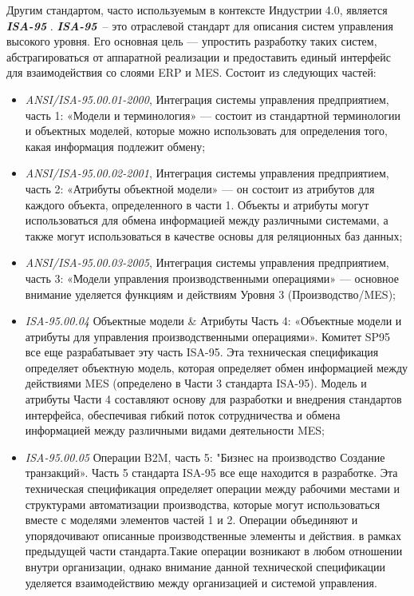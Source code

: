 Другим стандартом, часто используемым в контексте Индустрии 4.0, является \textit{\textbf{ISA-95}} \cite{ISA95}. \textit{\textbf{ISA-95}} – это отраслевой стандарт для описания систем управления высокого уровня. Его основная цель — упростить разработку таких систем, абстрагироваться от аппаратной реализации и предоставить единый интерфейс для взаимодействия со слоями ERP и MES. Состоит из следующих частей:
\begin{itemize}
\item \textit {ANSI/ISA-95.00.01-2000}, Интеграция системы управления предприятием, часть 1:
«Модели и терминология» — состоит из стандартной терминологии и объектных моделей, которые можно использовать для определения того, какая информация подлежит обмену;
\item \textit {ANSI/ISA-95.00.02-2001}, Интеграция системы управления предприятием, часть 2:
«Атрибуты объектной модели» — он состоит из атрибутов для каждого объекта, определенного в части 1. Объекты и атрибуты могут использоваться для обмена информацией между различными системами, а также могут использоваться в качестве основы для реляционных баз данных;
\item \textit {ANSI/ISA-95.00.03-2005}, Интеграция системы управления предприятием, часть 3:
«Модели управления производственными операциями» — основное внимание уделяется функциям и действиям Уровня 3 (Производство/MES);
\item \textit {ISA-95.00.04} Объектные модели \& Атрибуты Часть 4:
«Объектные модели и атрибуты для управления производственными операциями». Комитет SP95 все еще разрабатывает эту часть ISA-95. Эта техническая спецификация определяет объектную модель, которая определяет обмен информацией между действиями MES (определено в Части 3 стандарта ISA-95). Модель и атрибуты Части 4 составляют основу для разработки и внедрения стандартов интерфейса, обеспечивая гибкий поток сотрудничества и обмена информацией между различными видами деятельности MES;
\item \textit {ISA-95.00.05} Операции B2M, часть 5:
"Бизнес на производство Создание транзакций». Часть 5 стандарта ISA-95 все еще находится в разработке. Эта техническая спецификация определяет операции между рабочими местами и структурами автоматизации производства, которые могут использоваться вместе с моделями элементов частей 1 и 2. Операции объединяют и упорядочивают описанные производственные элементы и действия. в рамках предыдущей части стандарта.Такие операции возникают в любом отношении внутри организации, однако внимание данной технической спецификации уделяется взаимодействию между организацией и системой управления.
\end{itemize}


